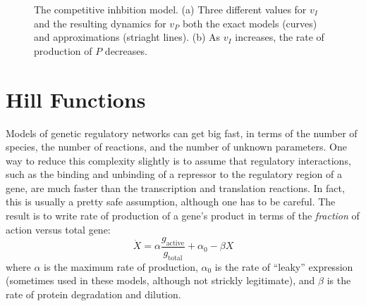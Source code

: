 \begin{figure}
\caption{\label{fig:comp-inhibit} The competitive inhbition model. (a)
  Three different values for $v_I$ and the resulting dynamics for
  $v_P$ both the exact models (curves) and approximations (striaght
  lines). (b) As $v_I$ increases, the rate of production of $P$
  decreases.  }
\end{figure}


\section{Hill Functions}

Models of genetic regulatory networks can get big fast, in terms of
the number of species, the number of reactions, and the number of
unknown parameters. One way to reduce this complexity slightly is to
assume that regulatory interactions, such as the binding and unbinding
of a repressor to the regulatory region of a gene, are much faster than
the transcription and translation reactions. In fact, this is usually
a pretty safe assumption, although one has to be careful. The result
is to write rate of production of a gene's product in terms of the
{\em fraction} of action versus total gene:
%
\begin{equation} \label{eqn:gene-fraction}
\dot X = \alpha \frac{g_\mathrm{active}}{g_\mathrm{total}} + \alpha_0 - \beta X
\end{equation}
%
where $\alpha$ is the maximum rate of production, $\alpha_0$ is the
rate of ``leaky'' expression (sometimes used in these models, although
not strickly legitimate), and $\beta$ is the rate of protein
degradation and dilution. 


